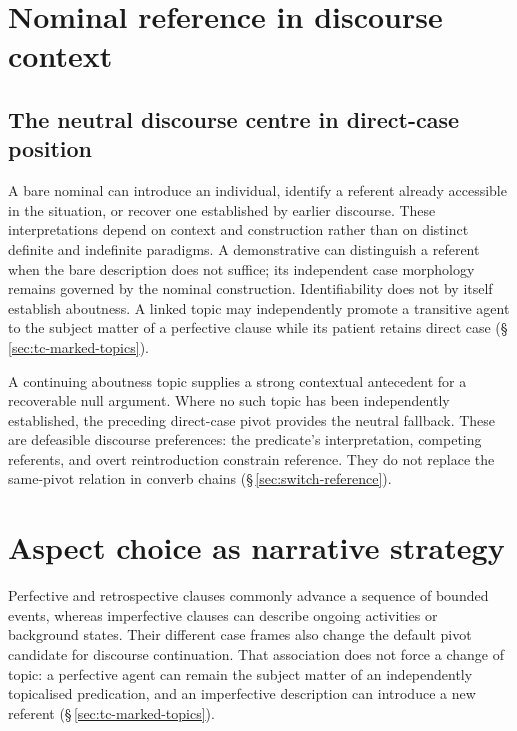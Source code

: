 \section{Nominal reference in discourse context}\label{sec:discourse-definiteness}

\subsection{The neutral discourse centre in direct-case position}
\label{sec:disc-def}

A bare nominal can introduce an individual, identify a referent already
 accessible in the situation, or recover one established by earlier discourse.
 These interpretations depend on context and construction rather than on
 distinct definite and indefinite paradigms. A demonstrative can distinguish
 a referent when the bare description does not suffice; its independent case
 morphology remains governed by the nominal construction. Identifiability
 does not by itself establish aboutness. A linked topic may independently
 promote a transitive agent to the subject matter of a perfective clause while
 its patient retains direct case (§\,\ref{sec:tc-marked-topics}).

A continuing aboutness topic supplies a strong contextual antecedent for a
 recoverable null argument. Where no such topic has been independently
 established, the preceding direct-case pivot provides the neutral fallback.
 These are defeasible discourse preferences: the predicate's interpretation,
 competing referents, and overt reintroduction constrain reference. They do
 not replace the same-pivot relation in converb chains
 (§\,\ref{sec:switch-reference}).

\section{Aspect choice as narrative strategy}\label{sec:aspect-narrative}

Perfective and retrospective clauses commonly advance a sequence of bounded
 events, whereas imperfective clauses can describe ongoing activities or
 background states. Their different case frames also change the default
 pivot candidate for discourse continuation. That association does not force
 a change of topic: a perfective agent can remain the subject matter of an
 independently topicalised predication, and an imperfective description can
 introduce a new referent (§\,\ref{sec:tc-marked-topics}).

